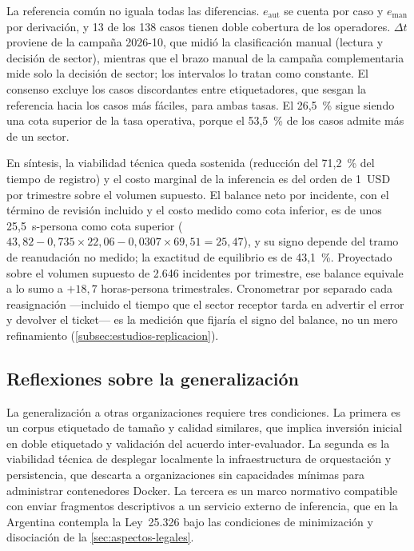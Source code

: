 La referencia común no iguala todas las diferencias. \(e_{\mathrm{aut}}\) se cuenta por caso y \(e_{\mathrm{man}}\) por derivación, y 13 de los 138 casos tienen doble cobertura de los operadores. \(\Delta t\) proviene de la campaña 2026-10, que midió la clasificación manual (lectura y decisión de sector), mientras que el brazo manual de la campaña complementaria mide solo la decisión de sector; los intervalos lo tratan como constante. El consenso excluye los casos discordantes entre etiquetadores, que sesgan la referencia hacia los casos más fáciles, para ambas tasas. El 26,5~\% sigue siendo una cota superior de la tasa operativa, porque el 53,5~\% de los casos admite más de un sector.

En síntesis, la viabilidad técnica queda sostenida (reducción del 71,2~\% del tiempo de registro) y el costo marginal de la inferencia es del orden de 1~USD por trimestre sobre el volumen supuesto. El balance neto por incidente, con el término de revisión incluido y el costo medido como cota inferior, es de unos 25,5~s-persona como cota superior (\(43{,}82 - 0{,}735 \times 22{,}06 - 0{,}0307 \times 69{,}51 = 25{,}47\)), y su signo depende del tramo de reanudación no medido; la exactitud de equilibrio es de 43,1~\%. Proyectado sobre el volumen supuesto de 2.646 incidentes por trimestre, ese balance equivale a lo sumo a \(+18{,}7\) horas-persona trimestrales. Cronometrar por separado cada reasignación ---incluido el tiempo que el sector receptor tarda en advertir el error y devolver el ticket--- es la medición que fijaría el signo del balance, no un mero refinamiento (\autoref{subsec:estudios-replicacion}).

\subsection{Reflexiones sobre la generalización}\label{subsec:reflexiones-generalizacion}

La generalización a otras organizaciones requiere tres condiciones. La primera es un corpus etiquetado de tamaño y calidad similares, que implica inversión inicial en doble etiquetado y validación del acuerdo inter-evaluador. La segunda es la viabilidad técnica de desplegar localmente la infraestructura de orquestación y persistencia, que descarta a organizaciones sin capacidades mínimas para administrar contenedores Docker. La tercera es un marco normativo compatible con enviar fragmentos descriptivos a un servicio externo de inferencia, que en la Argentina contempla la Ley~25.326 \parencite{Ley25326_2000} bajo las condiciones de minimización y disociación de la \autoref{sec:aspectos-legales}.

\newpage
